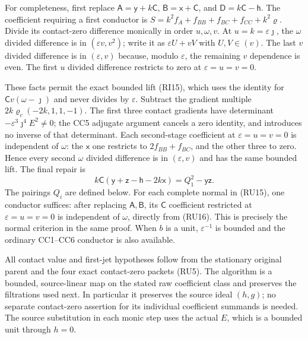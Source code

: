 For completeness, first replace $\mathsf A=\mathsf y+k\mathsf C$,
$\mathsf B=\mathsf x+\mathsf C$, and
$\mathsf D=k\mathsf C-\mathsf h$. The coefficient requiring a
first conductor is $S=k^2f_A+f_{BB}+f_{BC}+f_{CC}+k^2\varrho$.
Divide its contact-zero difference monically in order $u,\omega,v$.
At $u=k=\varepsilon\jmath$, the $\omega$ divided difference is in
$(\varepsilon v,v^2)$; write it as $\varepsilon U+vV$ with
$U,V\in(v)$. The last $v$ divided difference is in
$(\varepsilon,v)$ because, modulo $\varepsilon$, the remaining
$v$ dependence is even. The first $u$ divided difference restricts
to zero at $\varepsilon=u=v=0$.

These facts permit the exact bounded lift (RI15), which uses the
identity for $\mathsf Cv(\omega-\jmath)$ and never divides by
$\varepsilon$. Subtract the gradient multiple
$2k\varrho_c(-2k,1,1,-1)$. The first three contact gradients have
determinant $-\varepsilon^3\jmath^4E^2\ne0$; the CC5 adjugate
argument cancels a zero identity, and introduces no inverse of that
determinant. Each second-stage coefficient at
$\varepsilon=u=v=0$ is independent of $\omega$: the $\mathsf x$
one restricts to $2f_{BB}+f_{BC}$, and the other three to zero.
Hence every second $\omega$ divided difference is in
$(\varepsilon,v)$ and has the same bounded lift. The final repair is
\[
 k\mathsf C(\mathsf y+\mathsf z-\mathsf h-2k\mathsf x)
      =Q_1^2-\mathsf y\mathsf z.
 \tag{RU17}
\]
The pairings $Q_i$ are defined below. For each complete normal in
(RU15), one conductor suffices: after replacing $\mathsf A,\mathsf B$,
its $\mathsf C$ coefficient restricted at
$\varepsilon=u=v=0$ is independent of $\omega$, directly from
(RU16). This is precisely the normal criterion in the same proof.
When $b$ is a unit, $\varepsilon^{-1}$ is bounded and the ordinary
CC1--CC6 conductor is also available.

All contact value and first-jet hypotheses follow from the stationary
original parent and the four exact contact-zero packets (RU5).
The algorithm is a bounded, source-linear map on the stated raw
coefficient class and preserves the filtrations used next. In
particular it preserves the source ideal $(h,g)$; no separate
contact-zero assertion for its individual coefficient summands is
needed. The source substitution in each monic step uses the actual
$E$, which is a bounded unit through $h=0$.

